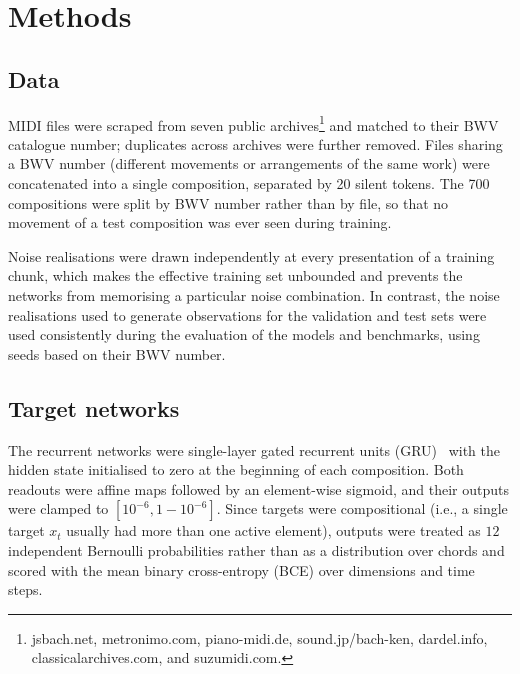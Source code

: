 \section*{Methods}

  \subsection*{Data}

    MIDI files were scraped from seven public archives\footnote{jsbach.net, metronimo.com, piano-midi.de, sound.jp/bach-ken, dardel.info, classicalarchives.com, and suzumidi.com.} and matched to their BWV catalogue number; duplicates across archives were further removed. Files sharing a BWV number (different movements or arrangements of the same work) were concatenated into a single composition, separated by 20 silent tokens. The 700 compositions were split by BWV number rather than by file, so that no movement of a test composition was ever seen during training.

    Noise realisations were drawn independently at every presentation of a training chunk, which makes the effective training set unbounded and prevents the networks from memorising a particular noise combination. In contrast, the noise realisations used to generate observations for the validation and test sets were used consistently during the evaluation of the models and benchmarks, using seeds based on their BWV number.

  \subsection*{Target networks}

    The recurrent networks were single-layer gated recurrent units (GRU)~\cite{cho2014gru} with the hidden state initialised to zero at the beginning of each composition. Both readouts were affine maps followed by an
    element-wise sigmoid, and their outputs were clamped to $[10^{-6}, 1-10^{-6}]$. Since targets were compositional (i.e., a single target $x_t$ usually had more than one active element), outputs were treated as $12$ independent Bernoulli probabilities rather than as a distribution over chords and scored with the mean binary cross-entropy (BCE) over dimensions and time steps.

